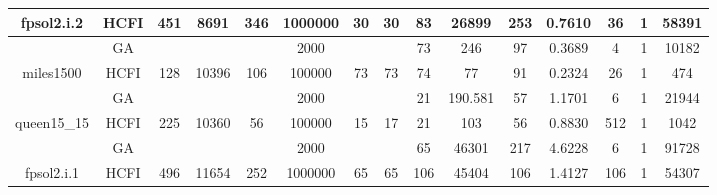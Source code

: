 \documentclass[10pt]{article}
\begin{document}
\begin{center}
\begin{table}[H]
\begin{tabular}{|c|c|c|c|c|c|c|c|c|c|c|c|c|c|c|}
 \multirow{-2}{*}{fpsol2.i.2} &HCFI   &\multirow{-2}{*}{451}   &\multirow{-2}{*}{8691}     &\multirow{-2}{*}{346}     &1000000     &\multirow{-2}{*}{\cellcolor{yellow}30}      & \multirow{-2}{*}{\cellcolor{yellow}30}    &{\cellcolor{green}83}     &26899         &253    &0.7610         &36   &1     &58391        \\ \hline \hline
	&GA&       &                   &                     & 2000        &     \cellcolor{yellow} & {\cellcolor{yellow}}& {{\cellcolor{green}73}}
&246   &97        &0.3689                   & 4                   &1          &10182        \\ \cline{2-2} \cline{6-6} \cline{9-15}
 \multirow{-2}{*}{miles1500} &HCFI   &\multirow{-2}{*}{128}   &\multirow{-2}{*}{10396}     &\multirow{-2}{*}{106}     &100000     &\multirow{-2}{*}{\cellcolor{yellow}73}      & \multirow{-2}{*}{\cellcolor{yellow}73}    &{\cellcolor{green}74}     &77         &91    &0.2324         &26    &1     &474        \\ \hline \hline
	&GA&       &                   &                     &   2000      &     \cellcolor{yellow} & {\cellcolor{yellow}}& {{\cellcolor{green}21}}
&190.581   &57        &1.1701                   & 6                   & 1         &21944         \\ \cline{2-2} \cline{6-6} \cline{9-15}
 \multirow{-2}{*}{queen15\_15} &HCFI   &\multirow{-2}{*}{225 }   &\multirow{-2}{*}{10360}     &\multirow{-2}{*}{56}     &100000     &\multirow{-2}{*}{\cellcolor{yellow}15}      & \multirow{-2}{*}{\cellcolor{yellow}17}    &{\cellcolor{green}21}     &103         &56    &0.8830         &512    &1     & 1042       \\ \hline \hline
	&GA&       &                   &                     &   2000      &     \cellcolor{yellow} & {\cellcolor{yellow}}& {{\cellcolor{green}65}}
&46301   &217        &4.6228                   &6                    &1          &91728        \\ \cline{2-2} \cline{6-6} \cline{9-15}
 \multirow{-2}{*}{fpsol2.i.1} &HCFI   &\multirow{-2}{*}{496}   &\multirow{-2}{*}{11654}     &\multirow{-2}{*}{252}     &1000000     &\multirow{-2}{*}{\cellcolor{yellow}65}      & \multirow{-2}{*}{\cellcolor{yellow}65}    &{\cellcolor{green}106}     &45404         &106    &        1.4127 &106    &1     &54307        \\ \hline \hline

\end{tabular}
\end{table}
\end{center}
\end{document}
